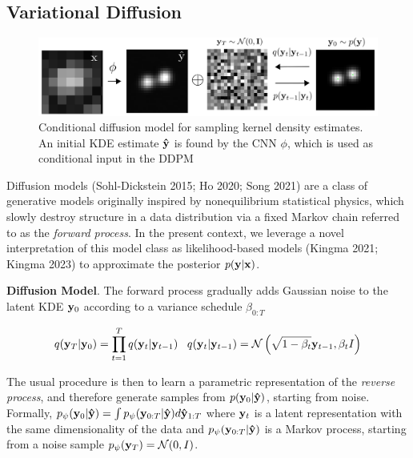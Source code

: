 \documentclass{article}
\begin{document}





\subsection{Variational Diffusion}

\begin{figure}
\includegraphics[scale=4.5]{Denoise.png}
\caption{Conditional diffusion model for sampling kernel density estimates. An initial KDE estimate $\bold{\hat{y}}$ is found by the CNN $\phi$, which is used as conditional input in the DDPM}
\end{figure}

Diffusion models (Sohl-Dickstein 2015; Ho 2020; Song 2021) are a class of generative models originally inspired by nonequilibrium statistical physics, which slowly destroy structure in a data distribution via a fixed Markov chain referred to as the \emph{forward process}. In the present context, we leverage a novel interpretation of this model class as likelihood-based models (Kingma 2021; Kingma 2023) to approximate the posterior $p(\bold{y}|\bold{x})$. 

\textbf{Diffusion Model}. The forward process gradually adds Gaussian noise to the latent KDE $\bold{y}_0$ according to a variance schedule $\beta_{0:T}$

\begin{equation}
q(\bold{y}_{T}|\bold{y}_{0}) = \prod_{t=1}^{T}q(\bold{y}_{t}|\bold{y}_{t-1}) \;\;\; q(\bold{y}_{t}|\bold{y}_{t-1}) = \mathcal{N}\left(\sqrt{1-\beta_{t}}\bold{y}_{t-1},\beta_t I\right)
\end{equation}

The usual procedure is then to learn a parametric representation of the \emph{reverse process}, and therefore generate samples from  $p(\bold{y}_{0}|\bold{\hat{y}})$, starting from noise. Formally, $p_{\psi}(\bold{y}_{0}|\bold{\hat{y}}) = \int p_{\psi}(\bold{y}_{0:T}|\bold{\hat{y}})d\bold{\hat{y}}_{1:T}$ where $\bold{y}_{t}$ is a latent representation with the same dimensionality of the data and $p_{\psi}(\bold{y}_{0:T}|\bold{\hat{y}})$ is a Markov process, starting from a noise sample $p_{\psi}(\bold{y}_{T}) = \mathcal{N}(0,I)$. 
\end{document}
